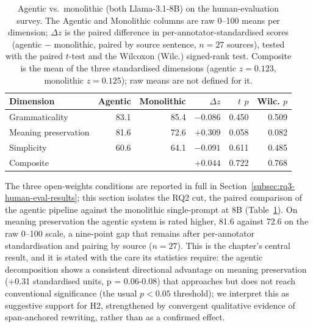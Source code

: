 \begin{table}[h!]
\centering
\small
\begin{tabular}{lrrrrr}
\hline
\textbf{Dimension} & \textbf{Agentic} & \textbf{Monolithic} & \textbf{$\Delta z$} & \textbf{$t$ $p$} & \textbf{Wilc. $p$} \\
\hline
Grammaticality        & 83.1 & 85.4 & $-0.086$ & 0.450 & 0.509 \\
Meaning preservation  & 81.6 & 72.6 & $+0.309$ & 0.058 & 0.082 \\
Simplicity            & 60.6 & 64.1 & $-0.091$ & 0.611 & 0.485 \\
\hline
Composite             &      &      & $+0.044$ & 0.722 & 0.768 \\
\hline
\end{tabular}
\caption{Agentic vs.\ monolithic (both Llama-3.1-8B) on the human-evaluation survey. The Agentic and Monolithic columns are raw 0--100 means per dimension; $\Delta z$ is the paired difference in per-annotator-standardised scores (agentic $-$ monolithic, paired by source sentence, $n=27$ sources), tested with the paired $t$-test and the Wilcoxon (Wilc.) signed-rank test. Composite is the mean of the three standardised dimensions (agentic $z=0.123$, monolithic $z=0.125$); raw means are not defined for it.}
\label{tab:rq2-human-eval}
\end{table}

The three open-weights conditions are reported in full in Section~\ref{subsec:rq3-human-eval-results}; this section isolates the RQ2 cut, the paired comparison of the agentic pipeline against the monolithic single-prompt at 8B (Table~\ref{tab:rq2-human-eval}). On meaning preservation the agentic system is rated higher, 81.6 against 72.6 on the raw 0--100 scale, a nine-point gap that remains after per-annotator standardisation and pairing by source ($n = 27$). This is the chapter's central result, and it is stated with the care its statistics require: the agentic decomposition shows a consistent directional advantage on meaning preservation (+0.31 standardised units, p = 0.06-0.08) that approaches but does not reach conventional significance (the usual $p < 0.05$ threshold); we interpret this as suggestive support for H2, strengthened by convergent qualitative evidence of span-anchored rewriting, rather than as a confirmed effect.

